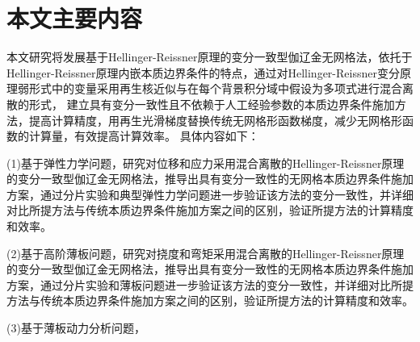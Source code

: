 \section{本文主要内容}

本文研究将发展基于Hellinger-Reissner原理的变分一致型伽辽金无网格法，依托于Hellinger-Reissner原理内嵌本质边界条件的特点，通过对Hellinger-Reissner变分原理弱形式中的变量采用再生核近似与在每个背景积分域中假设为多项式进行混合离散的形式，
建立具有变分一致性且不依赖于人工经验参数的本质边界条件施加方法，提高计算精度，用再生光滑梯度替换传统无网格形函数梯度，减少无网格形函数的计算量，有效提高计算效率。
具体内容如下：\par
(1)基于弹性力学问题，研究对位移和应力采用混合离散的Hellinger-Reissner原理的变分一致型伽辽金无网格法，推导出具有变分一致性的无网格本质边界条件施加方案，通过分片实验和典型弹性力学问题进一步验证该方法的变分一致性，并详细对比所提方法与传统本质边界条件施加方案之间的区别，验证所提方法的计算精度和效率。\par
(2)基于高阶薄板问题，研究对挠度和弯矩采用混合离散的Hellinger-Reissner原理的变分一致型伽辽金无网格法，推导出具有变分一致性的无网格本质边界条件施加方案，通过分片实验和薄板问题进一步验证该方法的变分一致性，并详细对比所提方法与传统本质边界条件施加方案之间的区别，验证所提方法的计算精度和效率。\par
(3)基于薄板动力分析问题，\par



